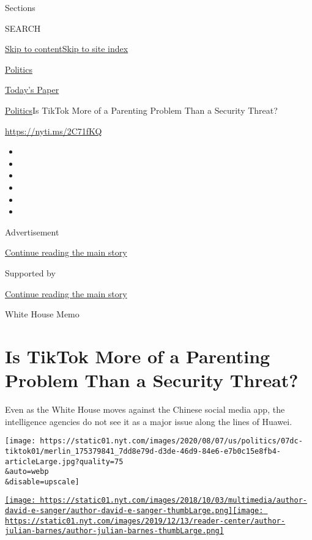 Sections

SEARCH

\protect\hyperlink{site-content}{Skip to
content}\protect\hyperlink{site-index}{Skip to site index}

\href{https://www.nytimes.com/section/politics}{Politics}

\href{https://myaccount.nytimes.com/auth/login?response_type=cookie\&client_id=vi}{}

\href{https://www.nytimes.com/section/todayspaper}{Today's Paper}

\href{/section/politics}{Politics}\textbar{}Is TikTok More of a
Parenting Problem Than a Security Threat?

\href{https://nyti.ms/2C71fKQ}{https://nyti.ms/2C71fKQ}

\begin{itemize}
\item
\item
\item
\item
\item
\item
\end{itemize}

Advertisement

\protect\hyperlink{after-top}{Continue reading the main story}

Supported by

\protect\hyperlink{after-sponsor}{Continue reading the main story}

White House Memo

\hypertarget{is-tiktok-more-of-a-parenting-problem-than-a-security-threat}{%
\section{Is TikTok More of a Parenting Problem Than a Security
Threat?}\label{is-tiktok-more-of-a-parenting-problem-than-a-security-threat}}

Even as the White House moves against the Chinese social media app, the
intelligence agencies do not see it as a major issue along the lines of
Huawei.

\texttt{[image: https://static01.nyt.com/images/2020/08/07/us/politics/07dc-tiktok01/merlin\_175379841\_7dd8e79d-d3de-46d9-84e6-e7b0c15e8fb4-articleLarge.jpg?quality=75\\\&auto=webp\\\&disable=upscale]}

\href{https://www.nytimes.com/by/david-e-sanger}{\texttt{[image: https://static01.nyt.com/images/2018/10/03/multimedia/author-david-e-sanger/author-david-e-sanger-thumbLarge.png]}}\href{https://www.nytimes.com/by/julian-e-barnes}{\texttt{[image: https://static01.nyt.com/images/2019/12/13/reader-center/author-julian-barnes/author-julian-barnes-thumbLarge.png]}}


